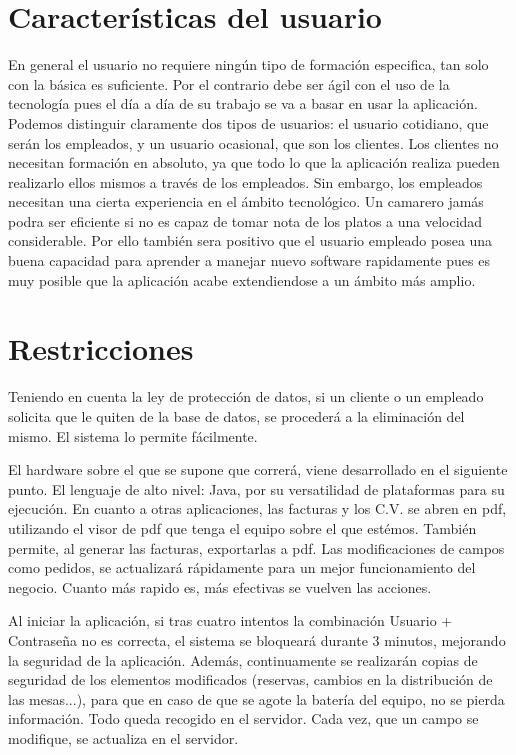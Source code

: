 \documentclass[spanish,a4paper,11pt, twoside]{report}	%
\begin{document}
\section{Características del usuario}
	En general el usuario no requiere ningún tipo de formación especifica, tan solo con la básica es suficiente. Por el contrario debe ser ágil con el uso de la tecnología pues el día a día de su trabajo se va a basar en usar la aplicación. Podemos distinguir claramente dos tipos de usuarios: el usuario cotidiano, que serán los empleados, y un usuario ocasional, que son los clientes. Los clientes no necesitan formación en absoluto, ya que todo lo que la aplicación realiza pueden realizarlo ellos mismos a través de los empleados. Sin embargo, los empleados necesitan una cierta experiencia en el ámbito tecnológico. Un camarero jamás podra ser eficiente si no es capaz de tomar nota de los platos a una velocidad considerable. Por ello también sera positivo que el usuario empleado posea una buena capacidad para aprender a manejar nuevo software rapidamente pues es muy posible que la aplicación acabe extendiendose a un ámbito más amplio.

\section{Restricciones}

Teniendo en cuenta la ley de protección de datos, si un cliente o un empleado solicita que le quiten de la base de datos, se procederá a la eliminación del mismo. El sistema lo permite fácilmente. 

El hardware sobre el que se supone que correrá, viene desarrollado en el siguiente punto. El lenguaje de alto nivel: Java, por su versatilidad de plataformas para su ejecución. En cuanto a otras aplicaciones, las facturas y los C.V. se abren en pdf, utilizando el visor de pdf que tenga el equipo sobre el que estémos. También permite, al generar las facturas, exportarlas a pdf. Las modificaciones de campos como pedidos, se actualizará rápidamente para un mejor funcionamiento del negocio. Cuanto más rapido es, más efectivas se vuelven las acciones.

Al iniciar la aplicación, si tras cuatro intentos la combinación Usuario + Contraseña no es correcta, el sistema se bloqueará durante 3 minutos, mejorando la seguridad de la aplicación. Además, continuamente se realizarán copias de seguridad de los elementos modificados (reservas, cambios en la distribución de las mesas...), para que en caso de que se agote la batería del equipo, no se pierda información. Todo queda recogido en el servidor. Cada vez, que un campo se modifique, se actualiza en el servidor.
\end{document}
